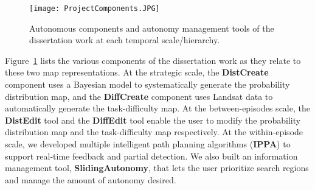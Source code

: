 
\begin{figure}
\centering
\texttt{[image: ProjectComponents.JPG]}
\caption{Autonomous components and autonomy management tools of the dissertation work at each temporal scale/hierarchy.}
\label{ProjectComponents}
\end{figure}

Figure~\ref{ProjectComponents} lists the various components of the dissertation work as they relate to these two map representations. At the strategic scale, the \textbf{DistCreate} component uses a Bayesian model to systematically generate the probability distribution map, and the \textbf{DiffCreate} component uses Landsat data to automatically generate the task-difficulty map. At the between-episodes scale, the \textbf{DistEdit} tool and the \textbf{DiffEdit} tool enable the user to modify the probability distribution map and the task-difficulty map respectively. At the within-episode scale, we developed multiple intelligent path planning algorithms (\textbf{IPPA}) to support real-time feedback and partial detection. We also built an information management tool, \textbf{SlidingAutonomy}, that lets the user prioritize search regions and manage the amount of autonomy desired.

